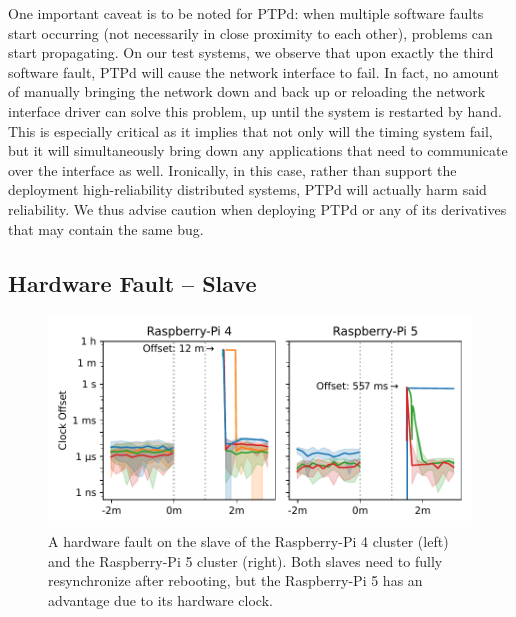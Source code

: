 One important caveat is to be noted for PTPd: when multiple software faults start occurring (not necessarily in close proximity to each other), problems can start propagating. On our test systems, we observe that upon exactly the third software fault, PTPd will cause the network interface to fail. In fact, no amount of manually bringing the network down and back up or reloading the network interface driver can solve this problem, up until the system is restarted by hand. This is especially critical as it implies that not only will the timing system fail, but it will simultaneously bring down any applications that need to communicate over the interface as well. Ironically, in this case, rather than support the deployment high-reliability distributed systems, PTPd will actually harm said reliability. We thus advise caution when deploying PTPd or any of its derivatives that may contain the same bug.

\subsection{Hardware Fault -- Slave}
\xdef\maxPiFour{\cmpMax}

\xdef\maxPiFive{\cmpMax}


\begin{figure}
    \centering
    \includegraphics[width=\linewidth]{res/generated/fault/hardware/slave_cluster_comparison.pdf}
    \legend
    \caption{A hardware fault on the slave of the Raspberry-Pi 4 cluster (left) and the Raspberry-Pi 5 cluster (right). Both slaves need to fully resynchronize after rebooting, but the Raspberry-Pi 5 has an advantage due to its hardware clock.}
    \label{fig:hardware_fault_slave}
\end{figure}


